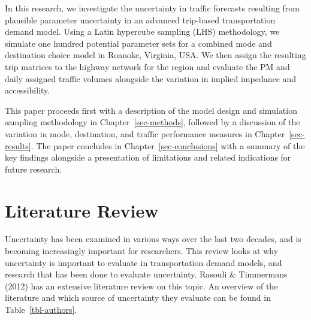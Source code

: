 \documentclass[
  letterpaper,
  authoryear,
  review,
  3p]{elsarticle}
\begin{document}
In this research, we investigate the uncertainty in traffic forecasts
resulting from plausible parameter uncertainty in an advanced trip-based
transportation demand model. Using a Latin hypercube sampling (LHS)
methodology, we simulate one hundred potential parameter sets for a
combined mode and destination choice model in Roanoke, Virginia, USA. We
then assign the resulting trip matrices to the highway network for the
region and evaluate the PM and daily assigned traffic volumes alongside
the variation in implied impedance and accessibility.

This paper proceeds first with a description of the model design and
simulation sampling methodology in Chapter~\ref{sec-methods}, followed
by a discussion of the variation in mode, destination, and traffic
performance measures in Chapter~\ref{sec-results}. The paper concludes
in Chapter~\ref{sec-conclusions} with a summary of the key findings
alongside a presentation of limitations and related indications for
future research.


\hypertarget{literature-review}{%
\section{Literature Review}\label{literature-review}}

Uncertainty has been examined in various ways over the last two decades,
and is becoming increasingly important for researchers. This review
looks at why uncertainty is important to evaluate in transportation
demand models, and research that has been done to evaluate uncertainty.
Rasouli \& Timmermans (2012) has an extensive literature review on this
topic. An overview of the literature and which source of uncertainty
they evaluate can be found in Table~\ref{tbl-authors}.
\end{document}
